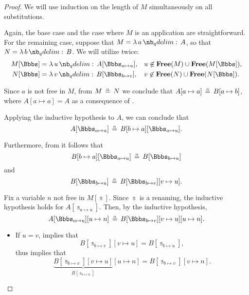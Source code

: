 \begin{proof}
  We will use induction on the length of \( M \) simultaneously on all substitutions.

  Again, the base case and the case where \( M \) is an application are straightforward. For the remaining case, suppose that \( M = \qabs a A \), so that \( N = \qabs b B \). We will utilize  twice:
  \begin{align*}
    M[\Bbbs] &= \qabs u A[\Bbbs_{a \mapsto u}], &&u \not\in \op*{Free}(M) \cup \op*{Free}(M[\Bbbs]), \\
    N[\Bbbs] &= \qabs v B[\Bbbs_{b \mapsto v}], &&v \not\in \op*{Free}(N) \cup \op*{Free}(N[\Bbbs]).
  \end{align*}

  Since \( a \) is not free in \( M \), from \( M \aequiv N \) we conclude that \( A[a \mapsto a] \aequiv B[a \mapsto b] \), where \( A[a \mapsto a] = A \) as a consequence of .

  Applying the inductive hypothesis to \( A \), we can conclude that
  \begin{equation*}
    A[\Bbbs_{a \mapsto u}] \aequiv B[b \mapsto a][\Bbbs_{a \mapsto u}].
  \end{equation*}

  Furthermore, from  it follows that
  \begin{equation*}
    B[b \mapsto a][\Bbbs_{a \mapsto u}] \aequiv B[\Bbbs_{b \mapsto u}]
  \end{equation*}
  and
  \begin{equation*}
    B[\Bbbs_{b \mapsto u}] \aequiv B[\Bbbs_{b \mapsto v}][v \mapsto u].
  \end{equation*}

  Fix a variable \( n \) not free in \( M[\Bbbs] \). Since \( \Bbbs \) is a renaming, the inductive hypothesis holds for \( A[\Bbbs_{a \mapsto u}] \). Then, by the inductive hypothesis,
  \begin{equation*}
    A[\Bbbs_{a \mapsto u}][u \mapsto n]
    \aequiv
    B[\Bbbs_{b \mapsto v}][v \mapsto u][u \mapsto n].
  \end{equation*}

  \begin{itemize}
    \item If \( u = v \),  implies that
    \begin{equation*}
      B[\Bbbs_{b \mapsto v}][v \mapsto u] = B[\Bbbs_{b \mapsto u}],
    \end{equation*}
    thus  implies that
    \begin{equation*}
      \underbrace{B[\Bbbs_{b \mapsto v}][v \mapsto u]}_{B[\Bbbs_{b \mapsto u}]}[u \mapsto n] = B[\Bbbs_{b \mapsto v}][v \mapsto n].
    \end{equation*}


\end{itemize}
\end{proof}
